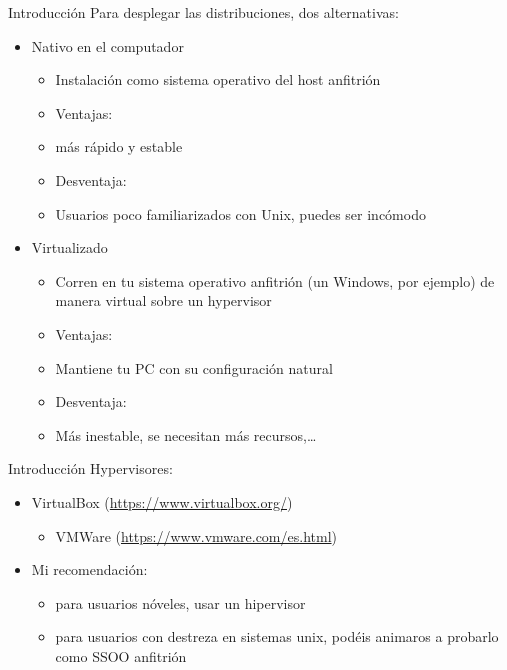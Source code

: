 \documentclass[aspectratio=169,11pt]{beamer}
\begin{document}
\begin{frame}[allowframebreaks]{Introducción}
\small
Para desplegar las distribuciones, dos alternativas:
  \begin{itemize}
  \item Nativo en el computador
    \begin{itemize}
    \item Instalación como sistema operativo del host anfitrión
    \item Ventajas:
    \item más rápido y estable
    \item Desventaja:
    \item Usuarios poco familiarizados con Unix, puedes ser incómodo
    \end{itemize}
  \item Virtualizado
    \begin{itemize}
    \item Corren en tu sistema operativo anfitrión (un Windows, por ejemplo) de manera virtual sobre un hypervisor
    \item Ventajas:
    \item Mantiene tu PC con su configuración natural
    \item Desventaja:
    \item Más inestable, se necesitan más recursos,\dots{}
    \end{itemize}
  \end{itemize}
\end{frame}



\begin{frame}[allowframebreaks]{Introducción}
\small
Hypervisores:
  \begin{itemize}
  \item VirtualBox (\href{https://www.virtualbox.org/}{https://www.virtualbox.org/})
    \begin{itemize}
    \item VMWare (\href{https://www.vmware.com/es.html}{https://www.vmware.com/es.html})
    \end{itemize}
  \item Mi recomendación:
    \begin{itemize}
    \item para usuarios nóveles, usar un hipervisor
    \item para usuarios con destreza en sistemas unix, podéis animaros a probarlo como SSOO anfitrión
    \end{itemize}
  \end{itemize}
\end{frame}
\end{document}
